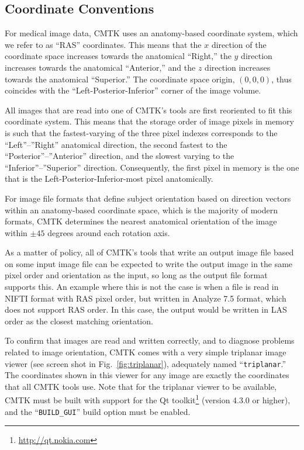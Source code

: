 \documentclass{InsightArticle}
\begin{document}
\subsection{Coordinate Conventions}

For medical image data, CMTK uses an anatomy-based coordinate system, which we
refer to as ``RAS'' coordinates. This means that the $x$ direction of the
coordinate space increases towards the anatomical ``Right,'' the $y$ direction
increases towards the anatomical ``Anterior,'' and the $z$ direction increases
towards the anatomical ``Superior.'' The coordinate space origin, $(0,0,0)$,
thus coincides with the ``Left-Posterior-Inferior'' corner of the image
volume. 

All images that are read into one of CMTK's tools are first reoriented to fit
this coordinate system. This means that the storage order of image pixels in
memory is such that the fastest-varying of the three pixel indexes corresponds
to the ``Left''--''Right'' anatomical direction, the second fastest to the
``Posterior''--''Anterior'' direction, and the slowest varying to the
``Inferior''--''Superior'' direction. Consequently, the first pixel in memory
is the one that is the Left-Posterior-Inferior-most pixel anatomically.

For image file formats that define subject orientation based on direction
vectors within an anatomy-based coordinate space, which is the majority of
modern formats, CMTK determines the nearest anatomical orientation of the
image within $\pm 45$ degrees around each rotation axis.

As a matter of policy, all of CMTK's tools that write an output image file
based on some input image file can be expected to write the output image in
the same pixel order and orientation as the input, so long as the output file
format supports this. An example where this is not the case is when a file is
read in NIFTI format with RAS pixel order, but written in Analyze 7.5 format,
which does not support RAS order. In this case, the output would be written in
LAS order as the closest matching orientation.

To confirm that images are read and written correctly, and to diagnose
problems related to image orientation, CMTK comes with a very simple triplanar
image viewer  (see screen shot in
Fig.~\ref{fig:triplanar}), adequately named ``\verb|triplanar|.'' The
coordinates shown in this viewer for any image are exactly the coordinates
that all CMTK tools use. Note that for the triplanar viewer to be available,
CMTK must be built with support for the Qt
toolkit\footnote{\url{http://qt.nokia.com}} (version 4.3.0 or higher), and the
``\verb|BUILD_GUI|'' build option must be enabled.
\end{document}
